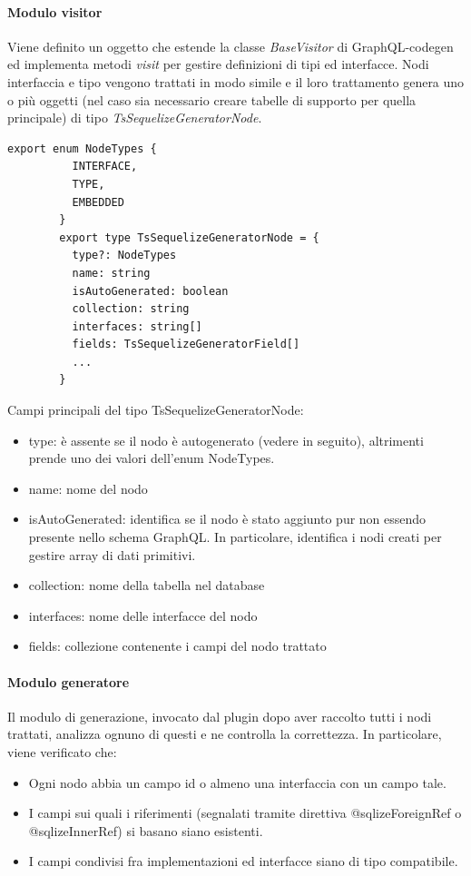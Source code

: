 \documentclass[a4paper, 12pt]{report}
\begin{document}
      \paragraph*{Modulo visitor}
      Viene definito un oggetto che estende la classe \emph{BaseVisitor} di GraphQL-codegen ed implementa metodi \emph{visit} per gestire definizioni di tipi ed interfacce.
      Nodi interfaccia e tipo vengono trattati in modo simile e il loro trattamento genera uno o più oggetti (nel caso sia necessario creare tabelle di supporto per quella principale) di tipo \emph{TsSequelizeGeneratorNode}.
      \begin{Verbatim}[samepage=true]
        export enum NodeTypes {
          INTERFACE,
          TYPE,
          EMBEDDED
        }
        export type TsSequelizeGeneratorNode = {
          type?: NodeTypes
          name: string
          isAutoGenerated: boolean
          collection: string
          interfaces: string[]
          fields: TsSequelizeGeneratorField[]
          ...
        }       
      \end{Verbatim}
      Campi principali del tipo TsSequelizeGeneratorNode:
      \begin{itemize}
        \item type: è assente se il nodo è autogenerato (vedere in seguito), altrimenti prende uno dei valori dell'enum NodeTypes.
        \item name: nome del nodo
        \item isAutoGenerated: identifica se il nodo è stato aggiunto pur non essendo presente nello schema GraphQL. In particolare, identifica i nodi creati per gestire array di dati primitivi.
        \item collection: nome della tabella nel database
        \item interfaces: nome delle interfacce del nodo
        \item fields: collezione contenente i campi del nodo trattato
      \end{itemize}
      \newpage
      \paragraph*{Modulo generatore}
      Il modulo di generazione, invocato dal plugin dopo aver raccolto tutti i nodi trattati, analizza ognuno di questi e ne controlla la correttezza.
      In particolare, viene verificato che:
      \begin{itemize}
        \item Ogni nodo abbia un campo id o almeno una interfaccia con un campo tale.
        \item I campi sui quali i riferimenti (segnalati tramite direttiva @sqlizeForeignRef o @sqlizeInnerRef) si basano siano esistenti.
        \item I campi condivisi fra implementazioni ed interfacce siano di tipo compatibile.
      \end{itemize}
\end{document}
